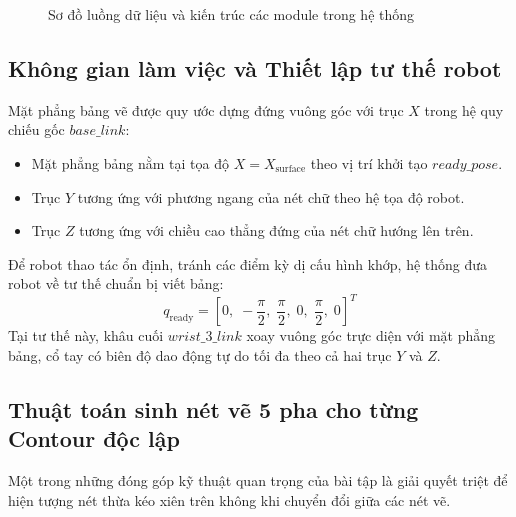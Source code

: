\documentclass[a4paper,12pt]{article}
\begin{document}
\begin{figure}[H]
{
}
\caption{Sơ đồ luồng dữ liệu và kiến trúc các module trong hệ thống}
\label{fig:system_architecture}
\end{figure}

\subsection{Không gian làm việc và Thiết lập tư thế robot}

Mặt phẳng bảng vẽ được quy ước dựng đứng vuông góc với trục $X$ trong hệ quy chiếu gốc $base\_link$:
\begin{itemize}
    \item Mặt phẳng bảng nằm tại tọa độ $X = X_{\text{surface}}$ theo vị trí khởi tạo $ready\_pose$.
    \item Trục $Y$ tương ứng với phương ngang của nét chữ theo hệ tọa độ robot.
    \item Trục $Z$ tương ứng với chiều cao thẳng đứng của nét chữ hướng lên trên.
\end{itemize}

Để robot thao tác ổn định, tránh các điểm kỳ dị cấu hình khớp, hệ thống đưa robot về tư thế chuẩn bị viết bảng:
\begin{equation}
q_{\text{ready}} = \left[ 0, \; -\frac{\pi}{2}, \; \frac{\pi}{2}, \; 0, \; \frac{\pi}{2}, \; 0 \right]^T
\end{equation}
Tại tư thế này, khâu cuối $wrist\_3\_link$ xoay vuông góc trực diện với mặt phẳng bảng, cổ tay có biên độ dao động tự do tối đa theo cả hai trục $Y$ và $Z$.

\subsection{Thuật toán sinh nét vẽ 5 pha cho từng Contour độc lập}
Một trong những đóng góp kỹ thuật quan trọng của bài tập là giải quyết triệt để hiện tượng nét thừa kéo xiên trên không khi chuyển đổi giữa các nét vẽ. 
\end{document}
